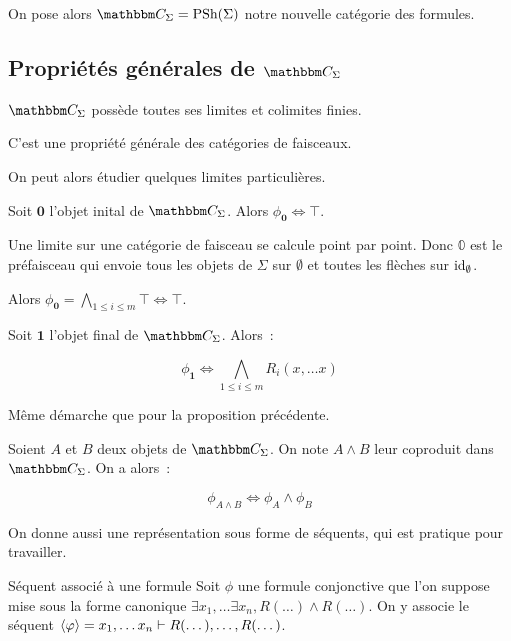 On pose alors $\C_\Sigma = \psh(\Sigma)$ notre nouvelle catégorie des formules.

\subsection{Propriétés générales de $\C_\Sigma$}

\begin{lem}
    $\C_\Sigma$ possède toutes ses limites et colimites finies.
\end{lem}

\begin{pv}
    C'est une propriété générale des catégories de faisceaux.
\end{pv}

On peut alors étudier quelques limites particulières.

\begin{lem}
    Soit $\mathbf{0}$ l'objet inital de $\C_\Sigma$. Alors $\phi_\mathbf{0}\iff\top$.
\end{lem}

\begin{pv}
    Une limite sur une catégorie de faisceau se calcule point par point. Donc $\mathbb{0}$
    est le préfaisceau qui envoie tous les objets de $\Sigma$ sur $\emptyset$ et toutes
    les flèches sur $\operatorname{id}_\emptyset$.

    Alors $\phi_\mathbf{0} = \bigwedge_{1\leq i\leq m}\top \iff \top$.
\end{pv}

\begin{lem}
    Soit $\mathbf{1}$ l'objet final de $\C_\Sigma$. Alors~:

    \[\phi_\mathbf{1} \iff \bigwedge_{1\leq i\leq m}R_i(x,\dots x)\]
\end{lem}

\begin{pv}
    Même démarche que pour la proposition précédente.
\end{pv}

\begin{lem}
    Soient $A$ et $B$ deux objets de $\C_\Sigma$. On note $A\wedge B$ leur coproduit
    dans $\C_\Sigma$. On a alors~:

    \[\phi_{A\wedge B} \iff \phi_A\wedge\phi_B \]
\end{lem}

On donne aussi une représentation sous forme de séquents, qui est pratique
pour travailler.

\begin{defi}{Séquent associé à une formule}\label{formSeq}
    Soit $\phi$ une formule conjonctive que l'on suppose mise sous la
    forme canonique $\exists x_1,\dots\exists x_n, R(\dots)\wedge R(\dots)$. On
    y associe le séquent $\langle{\varphi}\rangle = x_1,\dots x_n\vdash R(\dots), \dots, R(\dots)$.
\end{defi}

